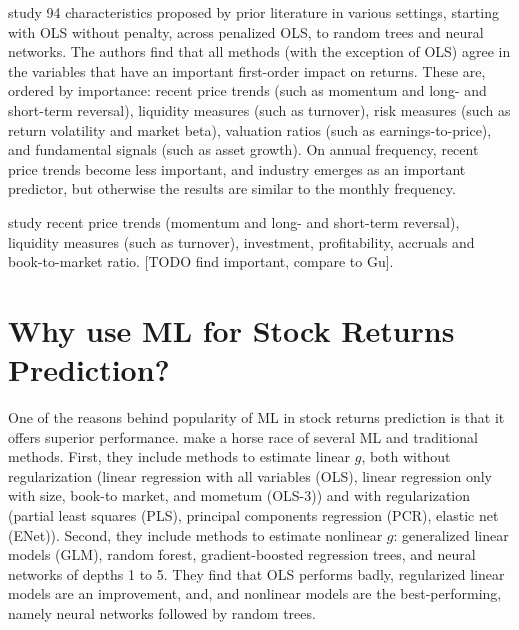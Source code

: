 		\cite{gu2020empirical} study 94 characteristics proposed by prior literature in various settings, starting with OLS without penalty, across penalized OLS, to random trees and neural networks. The authors find that all methods (with the exception of OLS) agree in the variables that have an important first-order impact on returns. These are, ordered by importance: recent price trends (such as momentum and long- and short-term reversal), liquidity measures (such as turnover), risk measures (such as return volatility and market beta), valuation ratios (such as earnings-to-price), and fundamental signals (such as asset growth). On annual frequency, recent price trends become less important, and industry emerges as an important predictor, but otherwise the results are similar to the monthly frequency. 
		
		\cite{bryzgalova2019forest} study recent price trends (momentum and long- and short-term reversal), liquidity measures (such as turnover), investment, profitability, accruals and book-to-market ratio. [TODO find important, compare to Gu]. 		
		
				
		\section{Why use ML for Stock Returns Prediction?}
				
			
			One of the reasons behind popularity of ML in stock returns prediction is that it offers superior performance. \cite{gu2020empirical} make a horse race of several ML and traditional methods. First, they include methods to estimate linear $g$, both without regularization (linear regression with all variables (OLS), linear regression only with size, book-to market, and mometum (OLS-3)) and with regularization (partial least squares (PLS), principal components regression (PCR), elastic net (ENet)). Second, they include methods to estimate nonlinear $g$: generalized linear models (GLM), random forest, gradient-boosted regression trees, and neural networks of depths 1 to 5. They find that OLS performs badly, regularized linear models are an improvement, and, and nonlinear models are the best-performing, namely neural networks followed by random trees. 
			
